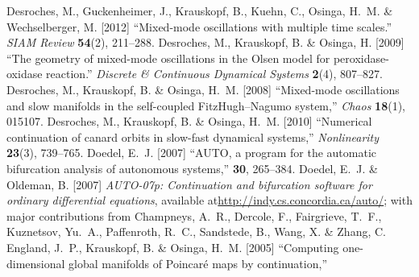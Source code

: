\documentclass{ws-ijbc}
\begin{document}
\begin{thebibliography}{46}
% 
% 
Desroches, M., Guckenheimer, J., Krauskopf, B., Kuehn, C., Osinga, H.~M. \& Wechselberger, M. [2012]
\newblock \enquote{{Mixed-mode oscillations with multiple time scales}.}
\newblock \emph{SIAM Review} \textbf{54}(2), 211--288.
% 
Desroches, M., Krauskopf, B. \& Osinga, H. [2009]
\newblock \enquote{{The geometry of mixed-mode oscillations in the {O}lsen model for peroxidase-oxidase reaction}.}
\newblock \emph{Discrete \& Continuous Dynamical Systems} \textbf{2}(4), 807--827.
% 
Desroches, M., Krauskopf, B. \& Osinga, H.~M. [2008]
\newblock \enquote{Mixed-mode oscillations and slow manifolds in the self-coupled {F}itz{H}ugh--{N}agumo system,}
\newblock \emph{Chaos} \textbf{18}(1), 015107.
% 
Desroches, M., Krauskopf, B. \& Osinga, H.~M. [2010]
\newblock \enquote{Numerical continuation of canard orbits in slow-fast dynamical systems,}
\newblock \emph{Nonlinearity} \textbf{23}(3),  739--765.
%
Doedel, E.~J. [2007]
\newblock \enquote{{AUTO}, a program for the automatic bifurcation analysis of autonomous systems,}
 \textbf{30}, 265--384.
%
Doedel, E.~J. \& Oldeman, B. [2007]
\newblock \emph{AUTO-07p: Continuation and bifurcation software for ordinary differential equations},
\newblock available at\urlprefix\url{http://indy.cs.concordia.ca/auto/}; with major contributions
  from Champneys, A.~R., Dercole, F., Fairgrieve, T.~F., Kuznetsov, Yu.~A., Paffenroth, R.~C., Sandstede, B., Wang, X. \& Zhang, C.
%
England, J.~P., Krauskopf, B. \& Osinga, H.~M. [2005]
\newblock \enquote{Computing one-dimensional global manifolds of {P}oincar{\'e} maps by continuation,}

\end{thebibliography}
\end{document}
